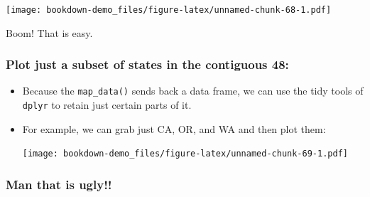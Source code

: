 \documentclass[]{book}
\newenvironment{Shaded}{\begin{snugshade}}{\end{snugshade}}
\newcommand{\KeywordTok}[1]{\textcolor[rgb]{0.13,0.29,0.53}{\textbf{{#1}}}}
\newcommand{\DataTypeTok}[1]{\textcolor[rgb]{0.13,0.29,0.53}{{#1}}}
\newcommand{\StringTok}[1]{\textcolor[rgb]{0.31,0.60,0.02}{{#1}}}
\newcommand{\NormalTok}[1]{{#1}}
\theoremstyle{definition}
\theoremstyle{definition}
\theoremstyle{remark}
\begin{document}
\texttt{[image: bookdown-demo\_files/figure-latex/unnamed-chunk-68-1.pdf]}

Boom! That is easy.

\subsubsection{Plot just a subset of states in the contiguous
48:}\label{plot-just-a-subset-of-states-in-the-contiguous-48}

\begin{itemize}
\item
  Because the \texttt{map\_data()} sends back a data frame, we can use
  the tidy tools of \texttt{dplyr} to retain just certain parts of it.
\item
  For example, we can grab just CA, OR, and WA and then plot them:

\begin{Shaded}
\end{Shaded}

  \texttt{[image: bookdown-demo\_files/figure-latex/unnamed-chunk-69-1.pdf]}
\end{itemize}

\subsubsection{Man that is ugly!!}\label{man-that-is-ugly}
\end{document}
